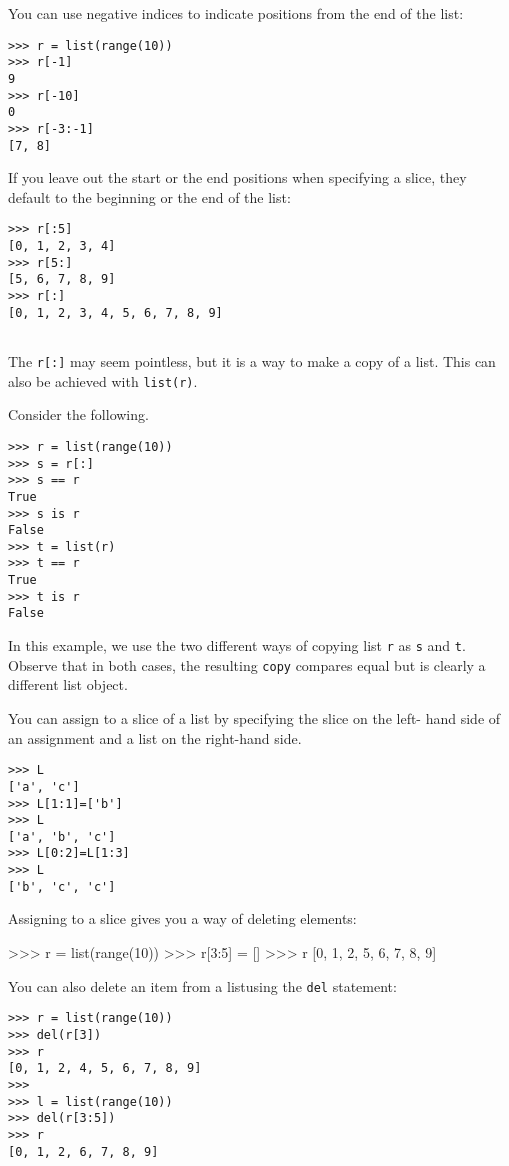 You can use negative indices to indicate positions from the end of the list:


\begin{verbatim}
>>> r = list(range(10))
>>> r[-1]
9
>>> r[-10]
0
>>> r[-3:-1]
[7, 8]  
\end{verbatim}

If you leave out the start or the end positions when specifying a slice, they default to the beginning or the end of the list:


\begin{verbatim}
>>> r[:5]
[0, 1, 2, 3, 4]
>>> r[5:]
[5, 6, 7, 8, 9]
>>> r[:]
[0, 1, 2, 3, 4, 5, 6, 7, 8, 9]
 
\end{verbatim}


The \verb"r[:]" may seem pointless, but it is a way to make a copy of a list.
This can also be achieved with \verb"list(r)".

Consider the following.

\begin{verbatim}
>>> r = list(range(10))
>>> s = r[:]
>>> s == r
True
>>> s is r
False
>>> t = list(r)
>>> t == r
True
>>> t is r
False  
\end{verbatim}

In this example, we use the two different ways of copying list \verb"r" as \verb"s" and \verb"t".
Observe that in both cases, the resulting \texttt{copy} compares equal but is clearly a different list object.


You can assign to a slice of a list
by specifying the slice on the left- hand side of an assignment and a
list on the right-hand side.

\begin{verbatim}
>>> L
['a', 'c']
>>> L[1:1]=['b']
>>> L
['a', 'b', 'c']
>>> L[0:2]=L[1:3]
>>> L
['b', 'c', 'c']  
\end{verbatim}

Assigning to a slice gives you a
way of deleting elements:

>>> r = list(range(10))
>>> r[3:5] = []
>>> r
[0, 1, 2, 5, 6, 7, 8, 9]

You can also delete an item from a listusing the \texttt{del} statement:


\begin{verbatim}
>>> r = list(range(10))
>>> del(r[3])
>>> r
[0, 1, 2, 4, 5, 6, 7, 8, 9]
>>>
>>> l = list(range(10))
>>> del(r[3:5])
>>> r
[0, 1, 2, 6, 7, 8, 9]
\end{verbatim}


